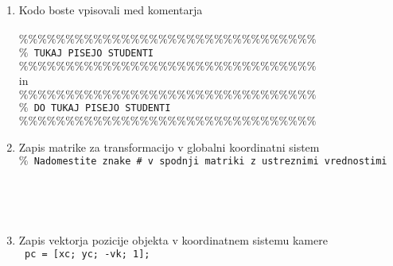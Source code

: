 \begin{mdframed}[backgroundcolor=yellow!20, shadow=true,roundcorner=8pt]
\begin{enumerate}
\item Kodo boste vpisovali med komentarja
\\ %
\\ %
\small %
\textcolor[rgb]{0.50,0.50,0.50}{\texttt{$\%\%\%\%\%\%\%\%\%\%\%\%\%\%\%\%\%\%\%\%\%\%\%\%\%\%\%\%\%\%\%\%$ }} \\%
\textcolor[rgb]{0.50,0.50,0.50}{\texttt{$\%$  TUKAJ PISEJO STUDENTI}} \\%
\textcolor[rgb]{0.50,0.50,0.50}{\texttt{$\%\%\%\%\%\%\%\%\%\%\%\%\%\%\%\%\%\%\%\%\%\%\%\%\%\%\%\%\%\%\%\%$ }} \\%
in
\\
\textcolor[rgb]{0.50,0.50,0.50}{\texttt{$\%\%\%\%\%\%\%\%\%\%\%\%\%\%\%\%\%\%\%\%\%\%\%\%\%\%\%\%\%\%\%\%$ }} \\%
\textcolor[rgb]{0.50,0.50,0.50}{\texttt{$\%$  DO TUKAJ PISEJO STUDENTI}} \\%
\textcolor[rgb]{0.50,0.50,0.50}{\texttt{$\%\%\%\%\%\%\%\%\%\%\%\%\%\%\%\%\%\%\%\%\%\%\%\%\%\%\%\%\%\%\%\%$ }}
\normalsize %
\item Zapis matrike za transformacijo v globalni koordinatni sistem
\\
\small %
\textcolor[rgb]{0.50,0.50,0.50}{\texttt{$\%$  Nadomestite znake \emph{\#} v spodnji matriki z ustreznimi vrednostimi}} \\%
\texttt{\tab{H = [} } \\
\texttt{\tab{} } \\
\texttt{\tab{} } \\
\texttt{\tab{} \tab{\emph{\#}  \emph{\#}  \emph{\#}  \emph{\#}];}}
\normalsize %
\item Zapis vektorja pozicije objekta v koordinatnem sistemu kamere
\\ %
\small %
\texttt{    pc = [xc; yc; -vk; 1];}
\normalsize %

\end{enumerate}
\end{mdframed}
